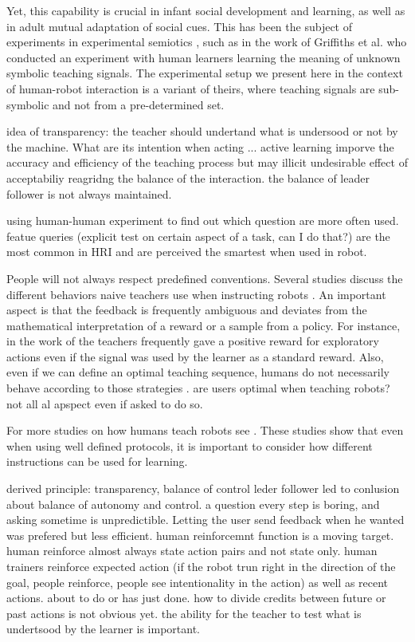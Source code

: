 Yet, this capability is crucial in infant social development and learning, as well as in adult mutual adaptation of social cues. This has been the subject of experiments in experimental semiotics \cite{galantucci2009experimental}, such as in the work of Griffiths et al. \cite{griffiths2012bottom} who conducted an experiment with human learners learning the meaning of unknown symbolic teaching signals. The experimental setup we present here in the context of human-robot interaction is a variant of theirs, where teaching signals are sub-symbolic and not from a pre-determined set.

idea of transparency: the teacher should undertand what is undersood or not by the machine. What are its intention when acting ...
\cite{chao2010transparent} active learning imporve the accuracy and efficiency of the teaching process but may illicit undesirable effect of acceptabiliy reagridng the balance of the interaction. the balance of leader follower is not always maintained.

\cite{cakmak2012designing} using human-human experiment to find out which question are more often used. featue queries (explicit test on certain aspect of a task, can I do that?) are the most common in HRI and are perceived the smartest when used in robot. 

People will not always respect predefined conventions. Several studies discuss the different behaviors naive teachers use when instructing robots \cite{thomaz2008teachable,Cakmak2010optimality}. An important aspect is that the feedback is frequently ambiguous and deviates from the mathematical interpretation of a reward or a sample from a policy. For instance, in the work of \cite{thomaz2008teachable} the teachers frequently gave a positive reward for exploratory actions even if the signal was used by the learner as a standard reward. Also, even if we can define an optimal teaching sequence, humans do not necessarily behave according to those strategies \cite{Cakmak2010optimality}. are users optimal when teaching robots? not all al apspect even if asked to do so.

For more studies on how humans teach robots see \cite{thomaz2009learning,kaochar2011towards,knox2012humans}. These studies show that even when using well defined protocols, it is important to consider how different instructions can be used for learning. 

derived principle: \cite{thomaz2008teachable} 
transparency, balance of control leder follower
\cite{cakmak2010designing} led to conlusion about balance of autonomy and control. a question every step is boring,  and asking sometime is unpredictible. Letting the user send feedback when he wanted was prefered but less efficient.
\cite{knox2009design} human reinforcemnt function is a moving target. human reinforce almost always state action pairs and not state only. human trainers reinforce expected action (if the robot trun right in the direction of the goal, people reinforce, people see intentionality in the action) as well as recent actions. about to do or has just done. how to divide credits between future or past actions is not obvious yet.
\cite{kaochar2011towards} the ability for the teacher to test what is undertsood by the learner is important.

